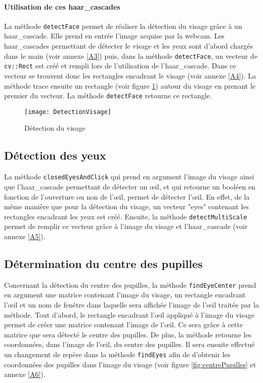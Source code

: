 \paragraph{Utilisation de ces haar\_cascades}

La méthode \lstinline=detectFace= permet de réaliser la détection du visage grâce à un haar\_cascade. Elle prend en entrée l’image acquise par la webcam. Les haar\_cascades permettant de détecter le visage et les yeux sont d’abord chargés dans le main (voir annexe \ref{A3}) puis, dans la méthode \lstinline=detectFace=, un vecteur de \lstinline=cv::Rect= est créé et rempli lors de l’utilisation de l’haar\_cascade. Dans ce vecteur se trouvent donc les rectangles encadrant le visage (voir annexe \ref{A4}). La méthode trace ensuite un rectangle (voir figure \ref{fig:DetectionVisage}) autour du visage en prenant le premier du vecteur. La méthode \lstinline=detectFace= retourne ce rectangle.

\begin{figure}[H]
  \centering
  \texttt{[image: DetectionVisage]}
  \caption{Détection du visage}
  \label{fig:DetectionVisage}
\end{figure}

\subsection{Détection des yeux}

La méthode \lstinline=closedEyesAndClick= qui prend en argument l’image du visage ainsi que l’haar\_cascade permettant de détecter un œil, et qui retourne un booléen en fonction de l’ouverture ou non de l’œil, permet de détecter l’œil. En effet, de la même manière que pour la détection du visage, un vecteur "eyes" contenant les rectangles encadrant les yeux est créé. Ensuite, la méthode \lstinline=detectMultiScale= permet de remplir ce vecteur grâce à l’image du visage et l’haar\_cascade (voir annexe \ref{A5}).

\subsection{Détermination du centre des pupilles}

Concernant la détection du centre des pupilles, la méthode \lstinline=findEyeCenter= prend en argument une matrice contenant l’image du visage, un rectangle encadrant l’œil et un nom de fenêtre dans laquelle sera affichée l’image de l’œil traitée par la méthode. Tout d’abord, le rectangle encadrant l’œil appliqué à l’image du visage permet de créer une matrice contenant l’image de l’œil. Ce sera grâce à cette matrice que sera détecté le centre des pupilles. De plus, la méthode retourne les coordonnées, dans l’image de l’œil, du centre des pupilles. Il sera ensuite effectué un changement de repère dans la méthode \lstinline=findEyes= afin de d’obtenir les coordonnées des pupilles dans l’image du visage (voir figure \ref{fig:centrePupilles} et annexe \ref{A6}).

